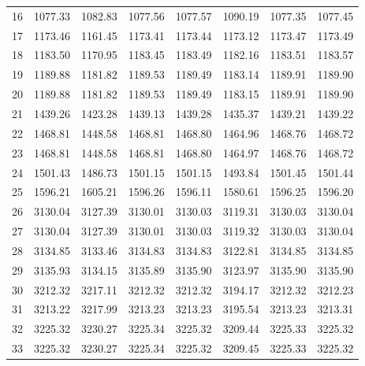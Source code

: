 \documentclass[10pt,oneside]{article}
\begin{document}
\begin{table}[h!]
\begin{tabular}{cccccccc}
16 &   1077.33 & 1082.83 & 1077.56 & 1077.57 &      1090.19 & 1077.35 & 1077.45 \\
17 &   1173.46 & 1161.45 & 1173.41 & 1173.44 &      1173.12 & 1173.47 & 1173.49 \\
18 &   1183.50 & 1170.95 & 1183.45 & 1183.49 &      1182.16 & 1183.51 & 1183.57 \\
19 &   1189.88 & 1181.82 & 1189.53 & 1189.49 &      1183.14 & 1189.91 & 1189.90 \\
20 &   1189.88 & 1181.82 & 1189.53 & 1189.49 &      1183.15 & 1189.91 & 1189.90 \\
21 &   1439.26 & 1423.28 & 1439.13 & 1439.28 &      1435.37 & 1439.21 & 1439.22 \\
22 &   1468.81 & 1448.58 & 1468.81 & 1468.80 &      1464.96 & 1468.76 & 1468.72 \\
23 &   1468.81 & 1448.58 & 1468.81 & 1468.80 &      1464.97 & 1468.76 & 1468.72 \\
24 &   1501.43 & 1486.73 & 1501.15 & 1501.15 &      1493.84 & 1501.45 & 1501.44 \\
25 &   1596.21 & 1605.21 & 1596.26 & 1596.11 &      1580.61 & 1596.25 & 1596.20 \\
26 &   3130.04 & 3127.39 & 3130.01 & 3130.03 &      3119.31 & 3130.03 & 3130.04 \\
27 &   3130.04 & 3127.39 & 3130.01 & 3130.03 &      3119.32 & 3130.03 & 3130.04 \\
28 &   3134.85 & 3133.46 & 3134.83 & 3134.83 &      3122.81 & 3134.85 & 3134.85 \\
29 &   3135.93 & 3134.15 & 3135.89 & 3135.90 &      3123.97 & 3135.90 & 3135.90 \\
30 &   3212.32 & 3217.11 & 3212.32 & 3212.32 &      3194.17 & 3212.32 & 3212.23 \\
31 &   3213.22 & 3217.99 & 3213.23 & 3213.23 &      3195.54 & 3213.23 & 3213.31 \\
32 &   3225.32 & 3230.27 & 3225.34 & 3225.32 &      3209.44 & 3225.33 & 3225.32 \\
33 &   3225.32 & 3230.27 & 3225.34 & 3225.32 &      3209.45 & 3225.33 & 3225.32 \\
\bottomrule
\end{tabular}
\end{table}

\clearpage
\end{document}
